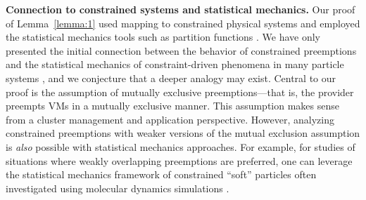 \noindent \textbf{Connection to constrained systems and statistical mechanics.} Our proof of Lemma~\ref{lemma:1} used mapping to constrained physical systems and employed the statistical mechanics tools such as partition functions \cite{krauth2006statistical}. 
We have only presented the initial connection between the behavior of constrained preemptions and the statistical mechanics of constraint-driven phenomena in many particle systems \cite{krauth2006statistical,solis}, and we conjecture that a deeper analogy may exist. 
Central to our proof is the assumption of mutually exclusive preemptions---that is, the provider preempts VMs in a mutually exclusive manner.
This assumption makes sense from a cluster management and application perspective. 
However, analyzing constrained preemptions with weaker versions of the mutual exclusion assumption is \emph{also} possible with statistical mechanics approaches. 
For example, for studies of situations where weakly overlapping preemptions are preferred, one can leverage the statistical mechanics framework of constrained ``soft'' particles often investigated using molecular dynamics simulations \cite{jing2015ionic}. 

